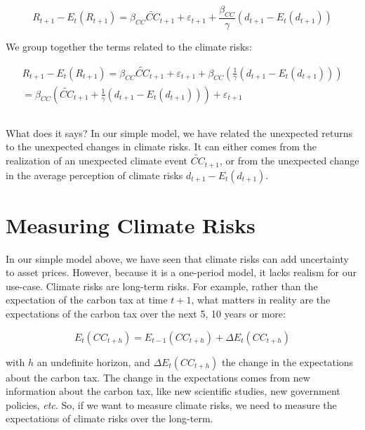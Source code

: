 \begin{equation}
    R_{t+1} - E_t(R_{t+1}) = \beta_{CC} \tilde{CC}_{t+1} + \varepsilon_{t+1} + \frac{\beta_{CC}}{\gamma}(d_{t+1} - E_t(d_{t+1}))
\end{equation}

We group together the terms related to the climate risks:

\begin{equation}
    \begin{aligned}
    R_{t+1} - E_t(R_{t+1}) = \beta_{CC} \tilde{CC}_{t+1} + \varepsilon_{t+1} + \beta_{CC} \left( \frac{1}{\gamma}(d_{t+1} - E_t(d_{t+1})) \right) \\
 = \beta_{CC} \left(\tilde{CC}_{t+1} + \frac{1}{\gamma}(d_{t+1} - E_t(d_{t+1})) \right) + \varepsilon_{t+1}
    \end{aligned}
\end{equation}

\begin{equation}
\end{equation}

What does it says? In our simple model, 
we have related the unexpected returns to the
unexpected changes in climate risks. It can 
either comes from the realization of an 
unexpected climate event $\tilde{CC}_{t+1}$,
or from the unexpected change in the average
perception of climate risks $d_{t+1} - E_t(d_{t+1})$.



\section{Measuring Climate Risks}

In our simple model above, we have seen that
climate risks can add uncertainty to asset prices.
However, because it is a one-period model,
it lacks realism for our use-case.
Climate risks are long-term risks. For example, 
rather than the expectation of the carbon tax at time $t+1$,
what matters in reality are the expectations
of the carbon tax over the next 5, 10 years or more:

\begin{equation}
    E_t(CC_{t+h}) = E_{t-1}(CC_{t+h}) + \Delta E_t(CC_{t+h})
\end{equation}

with $h$ an undefinite horizon, and $\Delta E_t(CC_{t+h})$
the change in the expectations about the carbon tax.
The change in the expectations comes from 
new information about the carbon tax, like
new scientific studies, new government policies,
\textit{etc}. So, if we want to measure climate risks,
we need to measure the expectations of climate risks
over the long-term.

